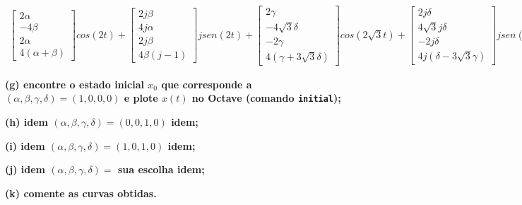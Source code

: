 \documentclass[11pt]{article}
\begin{document}
\begin{align*}
  \begin{bmatrix}
    2\alpha\\
    -4\beta\\
    2\alpha\\
    4(\alpha+\beta)
  \end{bmatrix}
  cos(2t) +
  \begin{bmatrix}
    2j\beta\\
    4j\alpha\\
    2j\beta\\
    4\beta(j-1)
  \end{bmatrix}
  jsen(2t) +
  \begin{bmatrix}
    2\gamma\\
    -4\sqrt{3}\delta\\
    -2\gamma\\
    4(\gamma+3\sqrt{3}\delta)
  \end{bmatrix}
  cos(2\sqrt{3}t) +
  \begin{bmatrix}
    2j\delta\\
    4\sqrt{3}j\delta\\
    -2j\delta\\
    4j(\delta-3\sqrt{3}\gamma)
  \end{bmatrix}
  jsen(2\sqrt{3}t)
\end{align*}

\textbf{(g) encontre o estado inicial $x_0$ que corresponde a $(\alpha, \beta, \gamma, \delta) = (1, 0, 0, 0)$ e plote $x(t)$ no Octave (comando \texttt{initial});}

\textbf{(h) idem $(\alpha, \beta, \gamma, \delta) = (0, 0, 1, 0)$ idem;}

\textbf{(i) idem $(\alpha, \beta, \gamma, \delta) = (1, 0, 1, 0)$ idem;}

\textbf{(j) idem $(\alpha, \beta, \gamma, \delta) = $ sua escolha idem;}

\textbf{(k) comente as curvas obtidas.}
\end{document}
